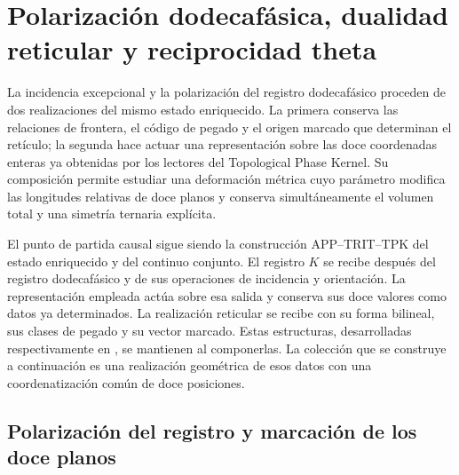 \section{Polarización dodecafásica, dualidad reticular y reciprocidad theta}
\label{sec:leech-dualidad}

La incidencia excepcional y la polarización del registro dodecafásico
proceden de dos realizaciones del mismo estado enriquecido. La primera
conserva las relaciones de frontera, el código de pegado y el origen
marcado que determinan el retículo; la segunda hace actuar una
representación sobre las doce coordenadas enteras ya obtenidas por los
lectores del Topological Phase Kernel. Su composición permite estudiar
una deformación métrica cuyo parámetro modifica las longitudes relativas
de doce planos y conserva simultáneamente el volumen total y una
simetría ternaria explícita.

El punto de partida causal sigue siendo la construcción
APP--TRIT--TPK del estado enriquecido y del continuo conjunto.
El registro \(K\) se recibe después del registro dodecafásico y de sus
operaciones de incidencia y orientación. La representación empleada
actúa sobre esa salida y conserva sus doce valores como datos ya
determinados. La realización reticular se recibe con su forma bilineal,
sus clases de pegado y su vector marcado. Estas estructuras, desarrolladas
respectivamente en \cite{hmtX,HMT-IV}, se mantienen al componerlas.
La colección que se construye a continuación es una realización geométrica
de esos datos con una coordenatización común de doce posiciones.

\subsection{Polarización del registro y marcación de los doce planos}
\label{subsec:leech-polarizacion}

